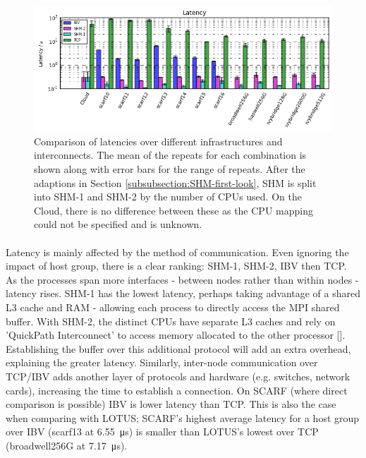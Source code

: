 \documentclass{article}
\begin{document}
            \begin{figure}[H]
                \centering
                \includegraphics[width=\textwidth]{compare_latency-hostgroup}
                \caption{Comparison of latencies over different infrastructures and interconnects. The mean of the repeats for each combination is shown along with error bars for the range of repeats. After the adaptions in Section \ref{subsubsection:SHM-first-look}, SHM is split into SHM-1 and SHM-2 by the number of CPUs used. On the Cloud, there is no difference between these as the CPU mapping could not be specified and is unknown.}
                \label{fig:compare_latency-hostgroup}
            \end{figure}

            \paragraph{}
            Latency is mainly affected by the method of communication. Even ignoring the impact of host group, there is a clear ranking: SHM-1, SHM-2, IBV then TCP. As the processes span more interfaces - between nodes rather than within nodes - latency rises. SHM-1 has the lowest latency, perhaps taking advantage of a shared L3 cache and RAM - allowing each process to directly access the MPI shared buffer. With SHM-2, the distinct CPUs have separate L3 caches and rely on 'QuickPath Interconnect' to access memory allocated to the other processor [\cite{intel2009}]. Establishing the buffer over this additional protocol will add an extra overhead, explaining the greater latency. Similarly, inter-node communication over TCP/IBV adds another layer of protocols and hardware (e.g. switches, network cards), increasing the time to establish a connection. On SCARF (where direct comparison is possible) IBV is lower latency than TCP. This is also the case when comparing with LOTUS; SCARF's highest average latency for a host group over IBV (scarf13 at \SI{6.55}{\micro\second}) is smaller than LOTUS's lowest over TCP (broadwell256G at \SI{7.17}{\micro\second}).
\end{document}
